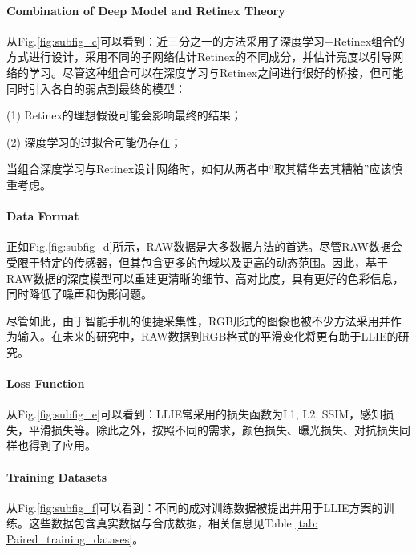 \documentclass[letterpaper,12pt]{article}
\begin{document}
	
	\paragraph{Combination of Deep Model and Retinex Theory} \qquad
	
	从Fig.\ref{fig:subfig_c}可以看到：近三分之一的方法采用了深度学习+Retinex组合的方式进行设计，采用不同的子网络估计Retinex的不同成分，并估计亮度以引导网络的学习。尽管这种组合可以在深度学习与Retinex之间进行很好的桥接，但可能同时引入各自的弱点到最终的模型：
	
	(1) Retinex的理想假设可能会影响最终的结果；
	
	(2) 深度学习的过拟合可能仍存在；
	
	当组合深度学习与Retinex设计网络时，如何从两者中“取其精华去其糟粕”应该慎重考虑。
	
	
	\paragraph{Data Format} \qquad
	
	正如Fig.\ref{fig:subfig_d}所示，RAW数据是大多数据方法的首选。尽管RAW数据会受限于特定的传感器，但其包含更多的色域以及更高的动态范围。因此，基于RAW数据的深度模型可以重建更清晰的细节、高对比度，具有更好的色彩信息，同时降低了噪声和伪影问题。
	
	尽管如此，由于智能手机的便捷采集性，RGB形式的图像也被不少方法采用并作为输入。在未来的研究中，RAW数据到RGB格式的平滑变化将更有助于LLIE的研究。
	
	
	\paragraph{Loss Function} \qquad
	
	从Fig.\ref{fig:subfig_e}可以看到：LLIE常采用的损失函数为L1, L2, SSIM，感知损失，平滑损失等。除此之外，按照不同的需求，颜色损失、曝光损失、对抗损失同样也得到了应用。
	
	\paragraph{Training Datasets} \qquad
	
	从Fig.\ref{fig:subfig_f}可以看到：不同的成对训练数据被提出并用于LLIE方案的训练。这些数据包含真实数据与合成数据，相关信息见Table \ref{tab: Paired_training_datases}。
	
\end{document}
